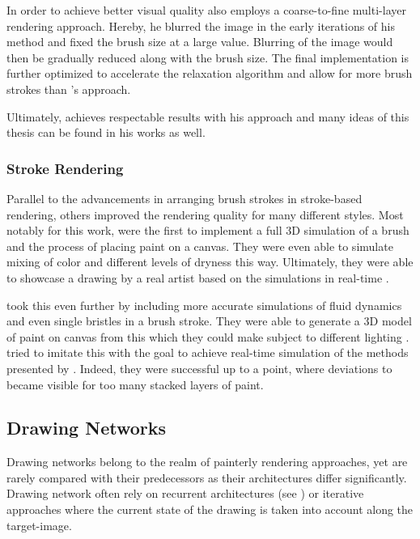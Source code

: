 In order to achieve better visual quality \citeauthor*{Hertzmann} also employs a coarse-to-fine multi-layer rendering approach.
Hereby, he blurred the image in the early iterations of his method and fixed the brush size at a large value.
Blurring of the image would then be gradually reduced along with the brush size.
The final implementation is further optimized to accelerate the relaxation algorithm and allow for more brush strokes than \citeauthor*{paintbynumbers}'s approach.

Ultimately, \citeauthor*{Hertzmann} achieves respectable results with his approach and many ideas of this thesis can be found in his works as well.

\subsubsection{Stroke Rendering}
Parallel to the advancements in arranging brush strokes in stroke-based rendering, others improved the rendering quality for many different styles.
Most notably for this work, \citeauthor*{baxter} were the first to implement a full 3D simulation of a brush and the process of placing paint on a canvas.
They were even able to simulate mixing of color and different levels of dryness this way.
Ultimately, they were able to showcase a drawing by a real artist based on the simulations in real-time \cite{baxter}.

\citeauthor*{wetbrush} took this even further by including more accurate simulations of fluid dynamics and even single bristles in a brush stroke.
They were able to generate a 3D model of paint on canvas from this which they could make subject to different lighting \cite{wetbrush}.
\citeauthor*{adobe} tried to imitate this with the goal to achieve real-time simulation of the methods presented by \citeauthor*{wetbrush}.
Indeed, they were successful up to a point, where deviations to \cite{wetbrush} became visible for too many stacked layers of paint.


\subsection{Drawing Networks}
Drawing networks belong to the realm of painterly rendering approaches, yet are rarely compared with their predecessors as their architectures differ significantly.
Drawing network often rely on recurrent architectures (see ) or iterative approaches where the current state of the drawing is taken into account along the target-image.

